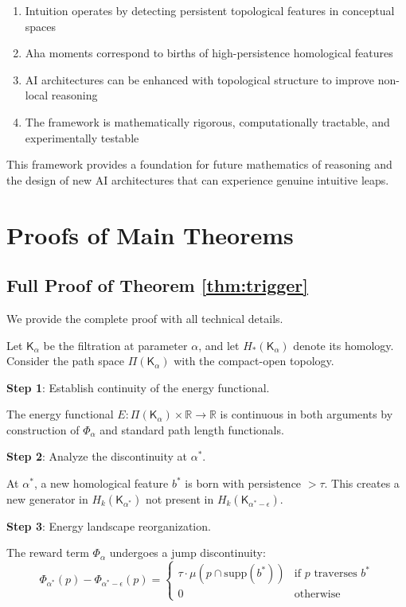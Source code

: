 \documentclass[11pt]{article}
\begin{document}
\begin{enumerate}
    \item Intuition operates by detecting persistent topological features in conceptual spaces
    \item Aha moments correspond to births of high-persistence homological features
    \item AI architectures can be enhanced with topological structure to improve non-local reasoning
    \item The framework is mathematically rigorous, computationally tractable, and experimentally testable
\end{enumerate}

This framework provides a foundation for future mathematics of reasoning and the design of new AI architectures that can experience genuine intuitive leaps.

\appendix

\section{Proofs of Main Theorems}

\subsection{Full Proof of Theorem \ref{thm:trigger}}

We provide the complete proof with all technical details.

Let $\mathsf{K}_\alpha$ be the filtration at parameter $\alpha$, and let $H_*(\mathsf{K}_\alpha)$ denote its homology. Consider the path space $\Pi(\mathsf{K}_\alpha)$ with the compact-open topology.

\textbf{Step 1}: Establish continuity of the energy functional.

The energy functional $E: \Pi(\mathsf{K}_\alpha) \times \mathbb{R} \to \mathbb{R}$ is continuous in both arguments by construction of $\Phi_\alpha$ and standard path length functionals.

\textbf{Step 2}: Analyze the discontinuity at $\alpha^*$.

At $\alpha^*$, a new homological feature $b^*$ is born with persistence $>\tau$. This creates a new generator in $H_k(\mathsf{K}_{\alpha^*})$ not present in $H_k(\mathsf{K}_{\alpha^*-\epsilon})$.

\textbf{Step 3}: Energy landscape reorganization.

The reward term $\Phi_\alpha$ undergoes a jump discontinuity:
$$\Phi_{\alpha^*}(p) - \Phi_{\alpha^*-\epsilon}(p) = \begin{cases}
\tau \cdot \mu(p \cap \text{supp}(b^*)) & \text{if } p \text{ traverses } b^* \\
0 & \text{otherwise}
\end{cases}$$
\end{document}
